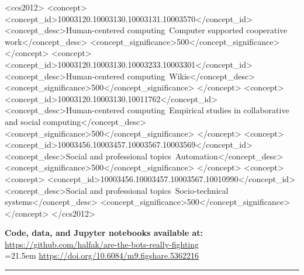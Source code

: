 \documentclass[format=acmsmall, review=false, screen=true]{acmart}%
\begin{document}
%
%
\begin{CCSXML}
<ccs2012>
<concept>
<concept_id>10003120.10003130.10003131.10003570</concept_id>
<concept_desc>Human-centered computing~Computer supported cooperative work</concept_desc>
<concept_significance>500</concept_significance>
</concept>
<concept>
<concept_id>10003120.10003130.10003233.10003301</concept_id>
<concept_desc>Human-centered computing~Wikis</concept_desc>
<concept_significance>500</concept_significance>
</concept>
<concept>
<concept_id>10003120.10003130.10011762</concept_id>
<concept_desc>Human-centered computing~Empirical studies in collaborative and social computing</concept_desc>
<concept_significance>500</concept_significance>
</concept>
<concept>
<concept_id>10003456.10003457.10003567.10003569</concept_id>
<concept_desc>Social and professional topics~Automation</concept_desc>
<concept_significance>500</concept_significance>
</concept>
<concept>
<concept>
<concept_id>10003456.10003457.10003567.10010990</concept_id>
<concept_desc>Social and professional topics~Socio-technical systems</concept_desc>
<concept_significance>500</concept_significance>
</concept>
</ccs2012>
\end{CCSXML}

%
%





\maketitle
\renewcommand{\shortauthors}{Geiger \& Halfaker}
\thispagestyle{firstpage}
\small
\textbf{Code, data, and Jupyter notebooks available at:} \url{https://github.com/halfak/are-the-bots-really-fighting}
\\
\hangindent=21.5em
 \url{https://doi.org/10.6084/m9.figshare.5362216}
    \vspace{.4cm}
    \hrule 
    \vspace{.2cm}
\normalsize
\end{document}
